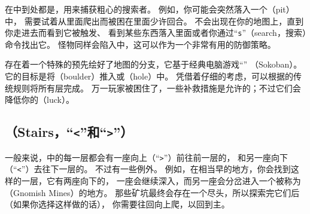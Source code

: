 \documentclass[a4paper, 10pt]{article}
\begin{document}
在\zhTransDungeon{}中到处都是\zhTransTraps，用来捕获粗心的搜索者。
例如，你可能会突然落入一个\zhTransPit{}（pit）中，
需要试着从里面爬出而被困在里面少许回合。
\zhTransTraps{}不会出现在你的地图上，直到你走进去而看到它被触发、
看到某些东西落入里面或者你通过“{\tt s}”（search，搜索）命令找出它。
怪物同样会陷入\zhTransTraps{}中，这可以作为一个非常有用的防御策略。

存在着一个特殊的预先绘好了地图的\zhTransDungeon{}分支，它基于经典电脑游戏“{\tt \zhTransSokoban}”
（Sokoban）。
它的目标是将\zhTransBoulders{}（boulder）推入\zhTransPit{}或\zhTransHole{}（hole）中。
凭借着仔细的考虑，可以根据\zhTransSokoban{}的传统规则将所有层完成。
万一玩家被困住了，一些补救措施是允许的；不过它们会降低你的\zhTransLuck（luck）。

\subsection*{\zhTransStairs（Stairs，“{\tt <}”和“{\tt >}”）}

一般来说，\zhTransDungeon{}中的每一层都会有一座向上（“{\tt >}”）前往前一层的\zhTransStairs，
和另一座向下（“{\tt <}”）去往下一层的\zhTransStairs。
不过有一些例外。
例如，在\zhTransDungeon{}相当早的地方，你会找到这样的一层，它有两座向下的\zhTransStairs{}，
一座会继续深入\zhTransDungeon{}，而另一座会分岔进入一个被称为\zhTransGnomishMines{}
（Gnomish Mines）的地方。
那些矿坑最终会存在一个尽头，所以探索完它们后（如果你选择这样做的话），
你需要往回向上爬，以回到主\zhTransDungeon{}。
\end{document}
